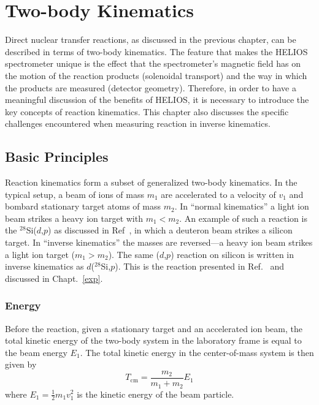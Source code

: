 \chapter{Two-body Kinematics}
\label{chapt:kin}
Direct nuclear transfer reactions, as discussed in the previous chapter, can be described in terms of two-body kinematics.  The feature that makes the HELIOS spectrometer unique is the effect that the spectrometer's magnetic field has on the  motion of the reaction products (solenoidal transport) and the way in which the products are measured (detector geometry).  Therefore, in order to have a meaningful discussion of the benefits of HELIOS, it is necessary to introduce the key concepts of reaction kinematics.  This chapter also discusses the specific challenges encountered when measuring reaction in inverse kinematics.  
\section{Basic Principles}
Reaction kinematics form a subset of generalized two-body kinematics.  In the typical %
setup, a beam of ions of mass $m_1$ are accelerated to a velocity of $v_1$ and bombard stationary target atoms of mass $m_2$.  In ``normal kinematics'' a light ion beam strikes a heavy ion target with $m_1<m_2$.  An example of such a reaction is the $^{28}$Si($d$,$p$) as discussed in Ref~\cite{Mermaz_1971}, in which a deuteron beam strikes a silicon target.  In ``inverse kinematics'' the masses are reversed---a heavy ion beam strikes a light ion target ($m_1>m_2$).  The same ($d$,$p$) reaction on silicon is written in inverse kinematics as $d$($^{28}$Si,$p$).  This is the reaction presented in Ref.~\cite{Lighthall_2010} and discussed in Chapt.~\ref{exp}.
\subsection{Energy}
Before the reaction, given a stationary target and an accelerated ion beam, the total kinetic energy of the two-body system in the laboratory frame is equal to the beam energy $E_1$.  
The total kinetic energy in the center-of-mass system is then given by
\begin{equation}
T_\mathrm{cm}=\frac{m_2}{m_1+m_2}E_1
\label{eq:total-energy}
\end{equation}
where $E_1=\frac{1}{2}m_1v_1^2$ is the kinetic energy of the beam particle.

